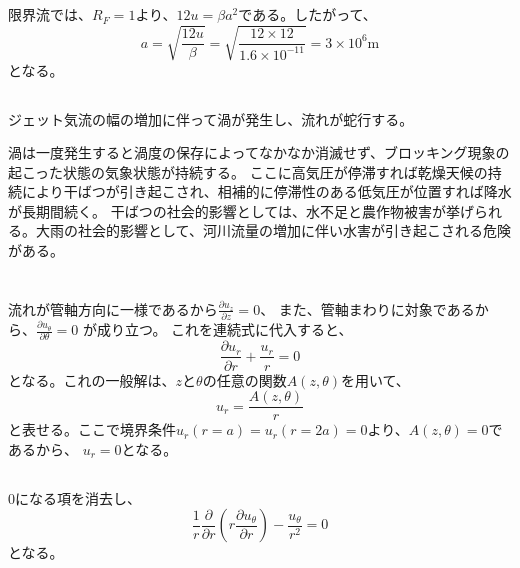\documentclass[a4paper]{jsarticle}
\begin{document}
\subsection{}
限界流では、$R_F = 1$より、$12 u = \beta a^2$である。したがって、
\begin{equation}
  a = \sqrt{\frac{12 u}{\beta}} = \sqrt{\frac{12 \times 12}{1.6 \times 10^{-11}}}
  = 3 \times 10^6 \mathrm{m}
\end{equation}
となる。

\subsection{}
ジェット気流の幅の増加に伴って渦が発生し、流れが蛇行する。\par
渦は一度発生すると渦度の保存によってなかなか消滅せず、ブロッキング現象の起こった状態の気象状態が持続する。
ここに高気圧が停滞すれば乾燥天候の持続により干ばつが引き起こされ、相補的に停滞性のある低気圧が位置すれば降水が長期間続く。
干ばつの社会的影響としては、水不足と農作物被害が挙げられる。大雨の社会的影響として、河川流量の増加に伴い水害が引き起こされる危険がある。

\section{}
\subsection{}
流れが管軸方向に一様であるから$\frac{\partial u_z}{\partial z} = 0$、
また、管軸まわりに対象であるから、$\frac{\partial u_{\theta}}{\partial \theta} = 0$
が成り立つ。
これを連続式に代入すると、
\begin{equation}
  \frac{\partial u_r}{\partial r} + \frac{u_r}{r} = 0
\end{equation}
となる。これの一般解は、$z$と$\theta$の任意の関数$A(z,\theta)$を用いて、
\begin{equation}
  u_r = \frac{A(z, \theta)}{r}
\end{equation}
と表せる。ここで境界条件$u_r(r = a) = u_r(r = 2a) = 0$より、$A(z, \theta) = 0$であるから、
$u_r = 0$となる。

\subsection{}
\subsubsection{}
0になる項を消去し、
\begin{equation}
  \frac{1}{r} \frac{\partial}{\partial r}
  \left(r \frac{\partial u_{\theta}}{\partial r}\right)
  - \frac{u_{\theta}}{r^2} = 0
\end{equation}
となる。
\end{document}
